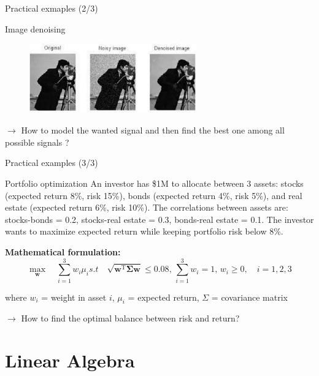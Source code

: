 \documentclass[aspectratio=1610]{beamer}
\begin{document}
\begin{frame}{Practical exmaples (2/3)}

  \begin{block}{Image denoising}
    \begin{figure}[h]
      \includegraphics[height=3cm]{figures/denoising.png}
    \end{figure}

  \end{block}
  
    \pause  

    $\rightarrow$ How to model the wanted signal and then find the best one among all possible signals ?
\end{frame}

\begin{frame}{Practical examples (3/3)}
  \begin{block}{Portfolio optimization}
    \small
    An investor has \$1M to allocate between 3 assets: stocks (expected return 8\%, risk 15\%), bonds (expected return 4\%, risk 5\%), and real estate (expected return 6\%, risk 10\%). The correlations between assets are: stocks-bonds = 0.2, stocks-real estate = 0.3, bonds-real estate = 0.1. The investor wants to maximize expected return while keeping portfolio risk below 8\%.
  \end{block}
  \pause
  
  \vspace{0.3cm}
  \textbf{Mathematical formulation:}
  \begin{equation}
    \max_{\mathbf{w}} \quad  \sum_{i=1}^{3} w_i \mu_i 
    s.t \quad \sqrt{\mathbf{w}^\mathrm{T} \boldsymbol{\Sigma} \mathbf{w}} \leq 0.08,\, \sum_{i=1}^{3} w_i = 1,\, w_i \geq 0, \quad i = 1,2,3
  \end{equation}
  
  where $w_i$ = weight in asset $i$, $\mu_i$ = expected return, $\Sigma$ = covariance matrix
  
  \pause
  $\rightarrow$ How to find the optimal balance between risk and return?
\end{frame}


\section{Linear Algebra}
\end{document}
